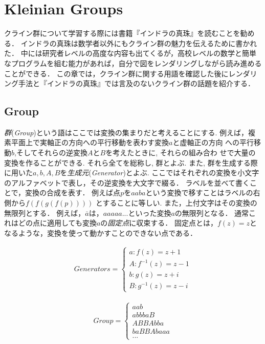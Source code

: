 
\section{Kleinian Groups}
クライン群について学習する際には書籍『インドラの真珠』\cite{indra}を読むことを勧める．
インドラの真珠は数学者以外にもクライン群の魅力を伝えるために書かれた．
中には研究者レベルの高度な内容も出てくるが，高校レベルの数学と簡単なプログラムを組む能力があれば，自分で図をレンダリングしながら読み進めることができる．
この章では，クライン群に関する用語を確認した後にレンダリング手法と『インドラの真珠』では言及のないクライン群の話題を紹介する．

\subsection{Group}

\emph{群}(\textit{Group})という語はここでは変換の集まりだと考えることにする.
例えば，複素平面上で実軸正の方向への平行移動を表わす変換$a$と虚軸正の方向
への平行移動$b$,そしてそれらの逆変換$A$と$B$を考えたときに, それらの組み合わ
せで大量の変換を作ることができる. それら全てを総称し, 群とよぶ.
また, 群を生成する際に用いた$a, b, A, B$を\emph{生成元}(\textit{Generator})とよぶ.
ここではそれぞれの変換を小文字のアルファベットで表し，その逆変換を大文字で綴る．
ラベルを並べて書くことで，変換の合成を表す．
例えば点$p$を$aaba$という変換で移すことはラベルの右側から$f(f(g(f(p))))$
とすることに等しい.
また，上付文字はその変換の無限列とする．
例えば，$\overline{a}$は，$aaaaa...$といった変換$a$の無限列となる．
通常これはどの点に適用しても変換$a$の\emph{固定点}に収束する．
固定点とは，$f(z) = z$となるような，変換を使って動かすことのできない点である．

\begin{minipage}{0.5\hsize}
 \begin{eqnarray*}
  Generators =
   \begin{cases}
    a \colon f(z) = z + 1  \\
    A \colon f^{-1}(z) = z - 1 \\
    b \colon g(z) = z + i \\
    B \colon g^{-1}(z) = z - i
   \end{cases}
 \end{eqnarray*}
\end{minipage}
\begin{minipage}{0.5\hsize}
 \begin{eqnarray*}
  Group =
   \begin{cases}
    aab\\
    abbbaB \\
    ABBAbba \\
    baBBAbaaa \\
    ...
   \end{cases}
 \end{eqnarray*}
\end{minipage}

